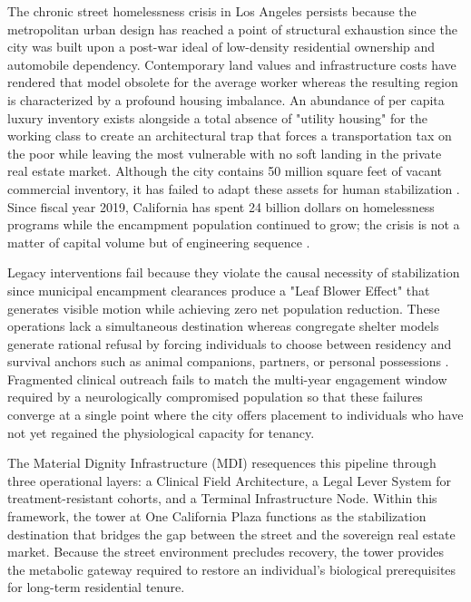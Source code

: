 \documentclass[12pt, letterpaper]{article}
\begin{document}
The chronic street homelessness crisis in Los Angeles persists because the metropolitan urban design has reached a point of structural exhaustion since the city was built upon a post-war ideal of low-density residential ownership and automobile dependency. Contemporary land values and infrastructure costs have rendered that model obsolete for the average worker whereas the resulting region is characterized by a profound housing imbalance. An abundance of per capita luxury inventory exists alongside a total absence of "utility housing" for the working class to create an architectural trap that forces a transportation tax on the poor while leaving the most vulnerable with no soft landing in the private real estate market. Although the city contains 50 million square feet of vacant commercial inventory, it has failed to adapt these assets for human stabilization \citep{globest_2025}. Since fiscal year 2019, California has spent 24 billion dollars on homelessness programs while the encampment population continued to grow; the crisis is not a matter of capital volume but of engineering sequence \citep{ca_24b_expenditure_2026, lahsa_count_2025}.

Legacy interventions fail because they violate the causal necessity of stabilization since municipal encampment clearances produce a "Leaf Blower Effect" that generates visible motion while achieving zero net population reduction. These operations lack a simultaneous destination whereas congregate shelter models generate rational refusal by forcing individuals to choose between residency and survival anchors such as animal companions, partners, or personal possessions \citep{usda_pet_barriers_2023, hud_shelter_barriers_2022}. Fragmented clinical outreach fails to match the multi-year engagement window required by a neurologically compromised population so that these failures converge at a single point where the city offers placement to individuals who have not yet regained the physiological capacity for tenancy.

The Material Dignity Infrastructure (MDI) resequences this pipeline through three operational layers: a Clinical Field Architecture, a Legal Lever System for treatment-resistant cohorts, and a Terminal Infrastructure Node. Within this framework, the tower at One California Plaza functions as the stabilization destination that bridges the gap between the street and the sovereign real estate market. Because the street environment precludes recovery, the tower provides the metabolic gateway required to restore an individual's biological prerequisites for long-term residential tenure.
\end{document}
